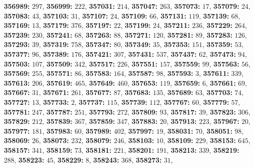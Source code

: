 \textsf{\bfseries 356989:} $297$, \textsf{\bfseries 356999:} $222$, \textsf{\bfseries 357031:} $214$, \textsf{\bfseries 357047:} $263$, \textsf{\bfseries 357073:} $17$, \textsf{\bfseries 357079:} $24$, \textsf{\bfseries 357083:} $43$, \textsf{\bfseries 357103:} $31$, \textsf{\bfseries 357107:} $24$, \textsf{\bfseries 357109:} $66$, \textsf{\bfseries 357131:} $119$, \textsf{\bfseries 357139:} $68$, \textsf{\bfseries 357169:} $13$, \textsf{\bfseries 357179:} $376$, \textsf{\bfseries 357197:} $22$, \textsf{\bfseries 357199:} $24$, \textsf{\bfseries 357211:} $236$, \textsf{\bfseries 357229:} $264$, \textsf{\bfseries 357239:} $230$, \textsf{\bfseries 357241:} $68$, \textsf{\bfseries 357263:} $88$, \textsf{\bfseries 357271:} $120$, \textsf{\bfseries 357281:} $89$, \textsf{\bfseries 357283:} $126$, \textsf{\bfseries 357293:} $39$, \textsf{\bfseries 357319:} $758$, \textsf{\bfseries 357347:} $80$, \textsf{\bfseries 357349:} $35$, \textsf{\bfseries 357353:} $151$, \textsf{\bfseries 357359:} $53$, \textsf{\bfseries 357377:} $96$, \textsf{\bfseries 357389:} $176$, \textsf{\bfseries 357421:} $307$, \textsf{\bfseries 357431:} $537$, \textsf{\bfseries 357437:} $62$, \textsf{\bfseries 357473:} $94$, \textsf{\bfseries 357503:} $107$, \textsf{\bfseries 357509:} $342$, \textsf{\bfseries 357517:} $226$, \textsf{\bfseries 357551:} $157$, \textsf{\bfseries 357559:} $99$, \textsf{\bfseries 357563:} $56$, \textsf{\bfseries 357569:} $255$, \textsf{\bfseries 357571:} $86$, \textsf{\bfseries 357583:} $164$, \textsf{\bfseries 357587:} $98$, \textsf{\bfseries 357593:} $3$, \textsf{\bfseries 357611:} $339$, \textsf{\bfseries 357613:} $206$, \textsf{\bfseries 357619:} $465$, \textsf{\bfseries 357649:} $460$, \textsf{\bfseries 357653:} $119$, \textsf{\bfseries 357659:} $6$, \textsf{\bfseries 357661:} $69$, \textsf{\bfseries 357667:} $31$, \textsf{\bfseries 357671:} $261$, \textsf{\bfseries 357677:} $87$, \textsf{\bfseries 357683:} $135$, \textsf{\bfseries 357689:} $63$, \textsf{\bfseries 357703:} $74$, \textsf{\bfseries 357727:} $13$, \textsf{\bfseries 357733:} $2$, \textsf{\bfseries 357737:} $115$, \textsf{\bfseries 357739:} $112$, \textsf{\bfseries 357767:} $60$, \textsf{\bfseries 357779:} $57$, \textsf{\bfseries 357781:} $247$, \textsf{\bfseries 357787:} $251$, \textsf{\bfseries 357793:} $272$, \textsf{\bfseries 357809:} $93$, \textsf{\bfseries 357817:} $39$, \textsf{\bfseries 357823:} $306$, \textsf{\bfseries 357829:} $212$, \textsf{\bfseries 357839:} $367$, \textsf{\bfseries 357859:} $347$, \textsf{\bfseries 357883:} $20$, \textsf{\bfseries 357913:} $223$, \textsf{\bfseries 357967:} $20$, \textsf{\bfseries 357977:} $181$, \textsf{\bfseries 357983:} $60$, \textsf{\bfseries 357989:} $402$, \textsf{\bfseries 357997:} $19$, \textsf{\bfseries 358031:} $70$, \textsf{\bfseries 358051:} $98$, \textsf{\bfseries 358069:} $26$, \textsf{\bfseries 358073:} $232$, \textsf{\bfseries 358079:} $246$, \textsf{\bfseries 358103:} $10$, \textsf{\bfseries 358109:} $229$, \textsf{\bfseries 358153:} $645$, \textsf{\bfseries 358157:} $341$, \textsf{\bfseries 358159:} $73$, \textsf{\bfseries 358181:} $221$, \textsf{\bfseries 358201:} $191$, \textsf{\bfseries 358213:} $339$, \textsf{\bfseries 358219:} $288$, \textsf{\bfseries 358223:} $45$, \textsf{\bfseries 358229:} $8$, \textsf{\bfseries 358243:} $368$, \textsf{\bfseries 358273:} $31$, 
